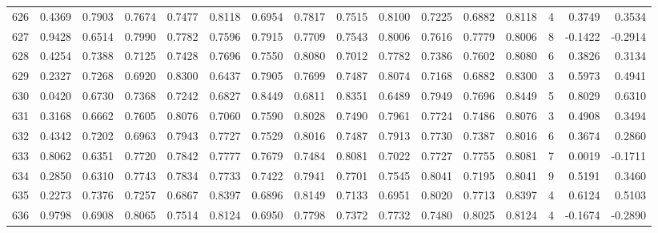 \begin{tabular}{lrrrrrrrrrrrrrrr}
626 &      0.4369 &  0.7903 &  0.7674 &  0.7477 &  0.8118 &  0.6954 &  0.7817 &  0.7515 &  0.8100 &  0.7225 &   0.6882 &     0.8118 &      4 &                    0.3749 &                     0.3534 \\
627 &      0.9428 &  0.6514 &  0.7990 &  0.7782 &  0.7596 &  0.7915 &  0.7709 &  0.7543 &  0.8006 &  0.7616 &   0.7779 &     0.8006 &      8 &                   -0.1422 &                    -0.2914 \\
628 &      0.4254 &  0.7388 &  0.7125 &  0.7428 &  0.7696 &  0.7550 &  0.8080 &  0.7012 &  0.7782 &  0.7386 &   0.7602 &     0.8080 &      6 &                    0.3826 &                     0.3134 \\
629 &      0.2327 &  0.7268 &  0.6920 &  0.8300 &  0.6437 &  0.7905 &  0.7699 &  0.7487 &  0.8074 &  0.7168 &   0.6882 &     0.8300 &      3 &                    0.5973 &                     0.4941 \\
630 &      0.0420 &  0.6730 &  0.7368 &  0.7242 &  0.6827 &  0.8449 &  0.6811 &  0.8351 &  0.6489 &  0.7949 &   0.7696 &     0.8449 &      5 &                    0.8029 &                     0.6310 \\
631 &      0.3168 &  0.6662 &  0.7605 &  0.8076 &  0.7060 &  0.7590 &  0.8028 &  0.7490 &  0.7961 &  0.7724 &   0.7486 &     0.8076 &      3 &                    0.4908 &                     0.3494 \\
632 &      0.4342 &  0.7202 &  0.6963 &  0.7943 &  0.7727 &  0.7529 &  0.8016 &  0.7487 &  0.7913 &  0.7730 &   0.7387 &     0.8016 &      6 &                    0.3674 &                     0.2860 \\
633 &      0.8062 &  0.6351 &  0.7720 &  0.7842 &  0.7777 &  0.7679 &  0.7484 &  0.8081 &  0.7022 &  0.7727 &   0.7755 &     0.8081 &      7 &                    0.0019 &                    -0.1711 \\
634 &      0.2850 &  0.6310 &  0.7743 &  0.7834 &  0.7733 &  0.7422 &  0.7941 &  0.7701 &  0.7545 &  0.8041 &   0.7195 &     0.8041 &      9 &                    0.5191 &                     0.3460 \\
635 &      0.2273 &  0.7376 &  0.7257 &  0.6867 &  0.8397 &  0.6896 &  0.8149 &  0.7133 &  0.6951 &  0.8020 &   0.7713 &     0.8397 &      4 &                    0.6124 &                     0.5103 \\
636 &      0.9798 &  0.6908 &  0.8065 &  0.7514 &  0.8124 &  0.6950 &  0.7798 &  0.7372 &  0.7732 &  0.7480 &   0.8025 &     0.8124 &      4 &                   -0.1674 &                    -0.2890 \\

\end{tabular}
